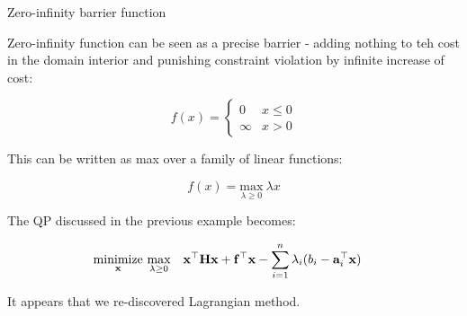 \documentclass{beamer}
\begin{document}
\begin{frame}{Zero-infinity barrier function}
	\begin{flushleft}
		
		Zero-infinity function can be seen as a precise barrier - adding nothing to teh cost in the domain interior and punishing constraint violation by infinite increase of cost:
		
		\begin{equation}
		f(x) = 
		\begin{cases}
			0 &x \leq 0 \\
			\infty &x > 0
		\end{cases}
		\end{equation}
		
		This can be written as max over a family of linear functions:
		
		\begin{equation}
			f(x) = 
			\underset{\lambda \geq 0}{\text{max}}  \  \lambda x
		\end{equation}		
		
		The QP discussed in the previous example becomes:
		
		\begin{equation}
			\begin{aligned}
				& \underset{\bo{x}}{\text{minimize}} \ \underset{\lambda \geq 0}{\text{max}}
				& & \bo{x}^\top \bo{H} \bo{x} + \bo{f}^\top \bo{x} - \sum\limits_{i = 1}^n \lambda_i (b_i - \bo{a}_i^\top \bo{x})
			\end{aligned}
		\end{equation}
		
		It appears that we re-discovered Lagrangian method.
		
		
	\end{flushleft}
\end{frame}
\end{document}
